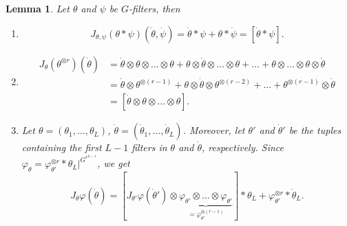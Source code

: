 \documentclass[final]{article}
\newcommand{\conv}{\ast}
\newcommand{\kprod}{\otimes}
\theoremstyle{definition}
\theoremstyle{plain}
\newtheorem{lemma}[definition]{Lemma}
\begin{document}
\begin{lemma}\label{lemma: jacobian_rules_conv_kprod}
    Let $\theta$ and $\psi$ be $G$-filters, then
    \begin{enumerate}
        \item   
        \[
    J_{\theta , \psi}(\theta \conv \psi)(\dot{\theta}, \dot{\psi}) = \dot{\theta}\conv \psi + \theta\conv \dot{\psi} = [\dot{\theta}\conv \psi].
    \]
    \item
\begin{align*}
        J_{\theta}(\theta^{\otimes r})(\dot{\theta}) &= \dot{\theta}\kprod \theta \kprod\hdots\kprod \theta + \theta \kprod \dot{\theta}  \kprod\hdots\kprod \theta + \hdots + \theta \kprod \hdots \kprod \theta \kprod \dot{\theta}\\
        &= \dot{\theta} \kprod \theta^{\otimes (r-1)} + \theta \kprod \dot{\theta} \kprod \theta^{\otimes (r-2)} + \hdots + \theta^{\otimes (r-1)} \kprod \dot{\theta}\\
        &= [\dot{\theta}\kprod \theta \kprod\hdots\kprod \theta].
\end{align*}

    \item Let $\theta = (\theta_1, \hdots, \theta_L)$, $\dot{\theta} = (\dot{\theta}_1, \hdots, \dot{\theta}_L)$. Moreover, let $\theta'$ and $\dot{\theta}'$ be the tuples containing the first $L-1$ filters in $\theta$ and $\dot{\theta}$, respectively. 
    Since $\varphi_\theta = \varphi_{\theta'}^{\otimes r} \conv \theta_L|^{G^{r^{L-1}}}$, we get
    \[
    J_\theta\varphi(\dot{\theta}) = [J_{\theta'}\varphi(\dot{\theta}') \kprod \underbrace{\varphi_{\theta'} \kprod \hdots \kprod \varphi_{\theta'}}_{= \varphi_{\theta'}^{\otimes (r-1)}}] \conv \theta_L + \varphi_{\theta'}^{\otimes r} \conv \dot{\theta}_L.
    \]
    \end{enumerate}
\end{lemma}
\end{document}

